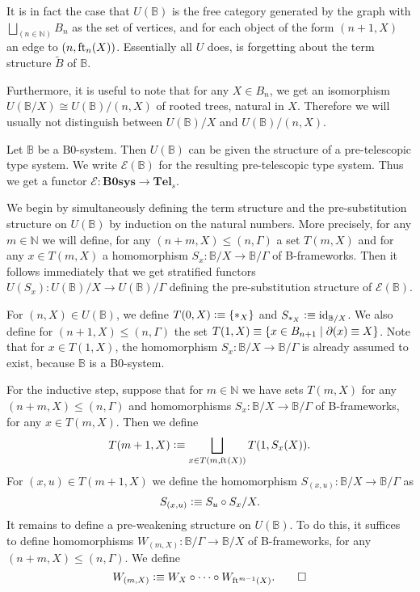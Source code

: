 \begin{rmk} 
It is in fact the case that $U(\mathbb{B})$ is the free category generated by the
graph with $\bigsqcup_{(n\in\mathbb{N})}B_n$ as the set of vertices, and
for each object of the form $(n+1,X)$ an edge to $(n,\eft[n](X))$. 
Essentially all $U$ does, is forgetting about the term structure 
$\tilde{B}$ of $\mathbb{B}$.

Furthermore, it is useful to note that for any $X\in B_n$, we get an 
isomorphism $U(\mathbb{B}/X)\cong  U(\mathbb{B})/(n,X)$ of rooted trees,
natural in $X$. Therefore we will usually not distinguish between $U(\mathbb{B})/X$
and $U(\mathbb{B})/(n,X)$. 
\end{rmk}

\begin{defn}
Let $\mathbb{B}$ be a B0-system. Then $U(\mathbb{B})$ can be given the structure
of a pre-telescopic type system. We write $\mathcal{E}(\mathbb{B})$ for the resulting
pre-telescopic type system. Thus we get a functor $\mathcal{E}:\mathbf{B0sys}\to\mathbf{Tel}_s$.
\end{defn}

\begin{constr}
We begin by simultaneously defining the term structure and the pre-substitution
structure on $U(\mathbb{B})$ by induction on the natural numbers. More precisely,
for any $m\in\mathbb{N}$ we will define, for any $(n+m,X)\leq (n,\Gamma)$ a set
$T(m,X)$ and for any $x\in T(m,X)$ a homomorphism 
$S_x:\mathbb{B}/X\to\mathbb{B}/\Gamma$ of B-frameworks. Then it follows
immediately that we get stratified functors $U(S_x):U(\mathbb{B})/X\to U(\mathbb{B})/\Gamma$
defining the pre-substitution structure of $\mathcal{E}(\mathbb{B})$.

For $(n,X)\in U(\mathbb{B})$, we define $T(0,X)\defeq
\{\pt[X]\}$ and $S_{\pt[X]}\defeq \catid{\mathbb{B}/X}$. We also define for
$(n+1,X)\leq (n,\Gamma)$ the set $T(1,X)\jdeq\{x\in B_{n+1}\mid \ebd(x)\jdeq X\}$.
Note that for $x\in T(1,X)$, the homomorphism $S_x:\mathbb{B}/X \to\mathbb{B}/\Gamma$
is already assumed to exist, because $\mathbb{B}$ is a B0-system.

For the inductive step, suppose that for $m\in\mathbb{N}$ we have sets $T(m,X)$
for any $(n+m,X)\leq (n,\Gamma)$ and homomorphisms $S_x:\mathbb{B}/X \to \mathbb{B}/\Gamma$
of B-frameworks, for any $x\in T(m,X)$. Then we define
\begin{equation*}
T(m+1,X)\defeq\bigsqcup_{x\in T(m,\eft(X))} T(1,S_x(X)).
\end{equation*}
For $(x,u)\in T(m+1,X)$ we define the homomorphism $S_{(x,u)}:\mathbb{B}/X\to
\mathbb{B}/\Gamma$ as
\begin{equation*}
S_{(x,u)}\defeq S_u\circ S_x/X.
\end{equation*}
It remains to define a pre-weakening structure on $U(\mathbb{B})$. To do this,
it suffices to define homomorphisms $W_{(m,X)}:\mathbb{B}/\Gamma \to\mathbb{B}/X$
of B-frameworks, for any $(n+m,X)\leq (n,\Gamma)$. We define
\begin{equation*}
W_{(m,X)}\defeq W_X\circ\cdots\circ W_{\eft^{m-1}(X)}.\qedhere
\end{equation*}
\end{constr}

